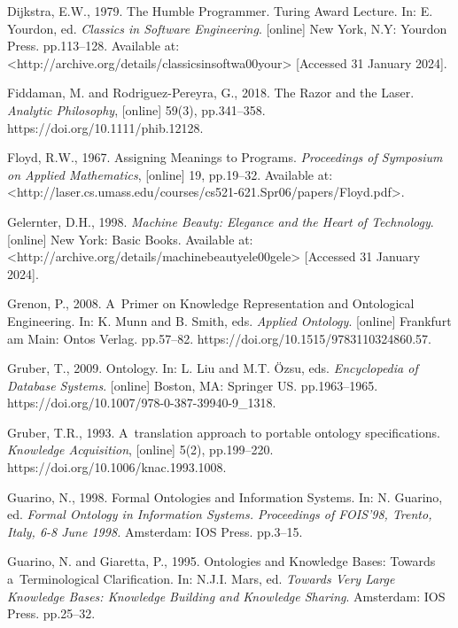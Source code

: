Dijkstra, E.W., 1979. The Humble Programmer. Turing Award Lecture. In: E. Yourdon, ed. \textit{Classics in Software Engineering}. [online] New York, N.Y: Yourdon Press. pp.113–128. Available at: {\textless}http://archive.org/details/classicsinsoftwa00your{\textgreater} [Accessed 31 January 2024].



Fiddaman, M. and Rodriguez-Pereyra, G., 2018. The Razor and the Laser. \textit{Analytic Philosophy}, [online] 59(3), pp.341–358. https://doi.org/10.1111/phib.12128.



Floyd, R.W., 1967. Assigning Meanings to Programs. \textit{Proceedings of Symposium on Applied Mathematics}, [online] 19, pp.19–32. Available at: {\textless}http://laser.cs.umass.edu/courses/cs521-621.Spr06/papers/Floyd.pdf{\textgreater}.



Gelernter, D.H., 1998. \textit{Machine Beauty: Elegance and the Heart of Technology}. [online] New York: Basic Books. Available at: {\textless}http://archive.org/details/machinebeautyele00gele{\textgreater} [Accessed 31 January 2024].



Grenon, P., 2008. A~Primer on Knowledge Representation and Ontological Engineering. In: K. Munn and B. Smith, eds. \textit{Applied Ontology}. [online] Frankfurt am Main: Ontos Verlag. pp.57–82. https://doi.org/10.1515/9783110324860.57.



Gruber, T., 2009. Ontology. In: L. Liu and M.T. Özsu, eds. \textit{Encyclopedia of Database Systems}. [online] Boston, MA: Springer US. pp.1963–1965. https://doi.org/10.1007/978-0-387-39940-9\_1318.



Gruber, T.R., 1993. A~translation approach to portable ontology specifications. \textit{Knowledge Acquisition}, [online] 5(2), pp.199–220. https://doi.org/10.1006/knac.1993.1008.



Guarino, N., 1998. Formal Ontologies and Information Systems. In: N. Guarino, ed. \textit{Formal Ontology in Information Systems. Proceedings of FOIS'98, Trento, Italy, 6-8 June 1998.} Amsterdam: IOS Press. pp.3–15.



Guarino, N. and Giaretta, P., 1995. Ontologies and Knowledge Bases: Towards a~Terminological Clarification. In: N.J.I. Mars, ed. \textit{Towards Very Large Knowledge Bases: Knowledge Building and Knowledge Sharing}. Amsterdam: IOS Press. pp.25–32.



